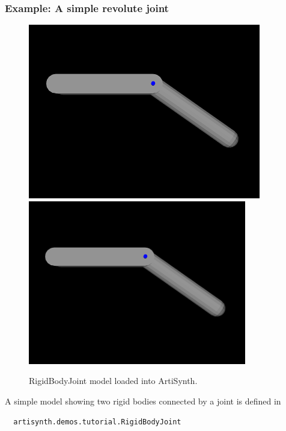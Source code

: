 \subsubsection{Example:  A simple revolute joint}
\label{RigidBodyJoint:sec}

\begin{figure}[h]
\begin{center}
\iflatexml
 \includegraphics[]{images/RigidBodyJoint}
\else
 \includegraphics[width=3.75in]{images/RigidBodyJoint}
\fi
\end{center}
\caption{RigidBodyJoint model loaded into ArtiSynth.}
\label{RigidBodyJoint:fig}
\end{figure}

A simple model showing two rigid bodies connected by
a joint is defined in
%
\begin{verbatim}
  artisynth.demos.tutorial.RigidBodyJoint
\end{verbatim}
%

